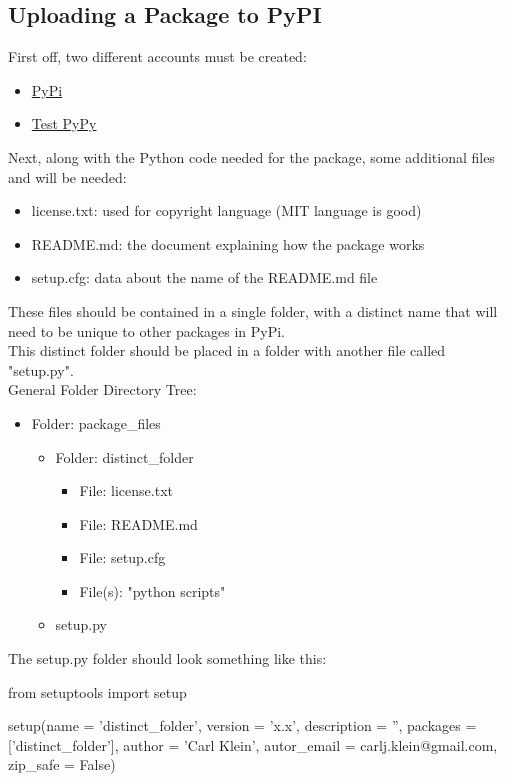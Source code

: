 \subsection{Uploading a Package to PyPI}
First off, two different accounts must be created:
\begin{itemize}
	\item \href{pypi.org}{PyPi}
	\item \href{test.pypy.org}{Test PyPy}
\end{itemize}

Next, along with the Python code needed for the package, some additional files and will be needed:
\begin{itemize}
	\item license.txt: used for copyright language (MIT language is good)
	\item README.md: the document explaining how the package works
	\item setup.cfg: data about the name of the README.md file
\end{itemize}

These files should be contained in a single folder, with a distinct name that will need to be unique to other packages in PyPi.
\\

This distinct folder should be placed in a folder with another file called "setup.py".
\\

General Folder Directory Tree:
\begin{itemize}
	\item Folder: package\_files
	\begin{itemize}
		\item Folder: distinct\_folder
		\begin{itemize}
			\item File: license.txt
			\item File: README.md
			\item File: setup.cfg
			\item File(s): "python scripts"
		\end{itemize}
		\item setup.py
	\end{itemize}
\end{itemize}

The setup.py folder should look something like this:
\begin{python}
	from setuptools import setup
	
	setup(name = 'distinct_folder',
		  version = 'x.x',
		  description = '',
		  packages = ['distinct_folder'],
		  author = 'Carl Klein',
		  autor_email = carlj.klein@gmail.com,
		  zip_safe = False)
\end{python}

